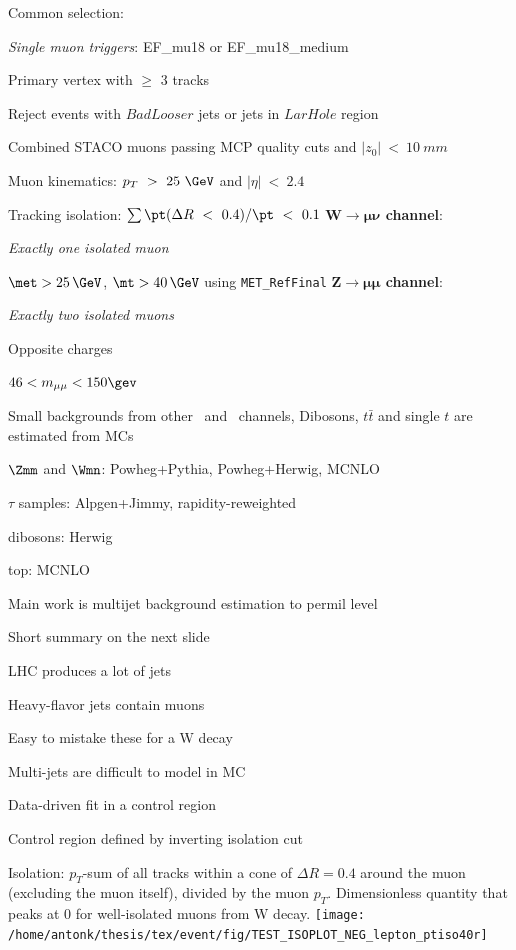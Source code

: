 {
Common selection:
\iteb
\item \textit{Single muon triggers}: EF\_mu18 or EF\_mu18\_medium
\item Primary vertex with $\ge$ 3 tracks
\item Reject events with $BadLooser$ jets or jets in $LarHole$ region
\item Combined STACO muons passing MCP quality cuts and $|z_0|~<~10~mm$
\item Muon kinematics: $p_T~>~25~\GeV$ and $|\eta|~<~2.4$
\item Tracking isolation: $\sum \pt(\Delta R~<~0.4) / \pt~<~0.1$
\itee
\textbf{\large $\mathbf{W \to \mu\nu}$ channel}:
\iteb
\item \textit{Exactly one isolated muon}
\item $\met > 25\,\GeV$, $\mt > 40\,\GeV$ using \texttt{MET\_RefFinal}
\itee
\textbf{\large $\mathbf{Z \to \mu\mu}$ channel}:
\iteb
\item \textit{Exactly two isolated muons}
\item Opposite charges
\item $46 < m_{\mu\mu} < 150\gev$
\itee
}

{
\iteb
\item Small backgrounds from other \Zll\ and \Wln\ channels, Dibosons,
  $t\bar{t}$ and single $t$ are estimated from MCs
\iteb
\item $\Zmm$ and $\Wmn$: Powheg+Pythia, Powheg+Herwig, MCNLO
\item $\tau$ samples: Alpgen+Jimmy, rapidity-reweighted
\item dibosons: Herwig
\item top: MCNLO
\itee
\item Main work is multijet background estimation to permil level
\iteb
\item Short summary on the next slide
\itee
\itee
}

{
\iteb
\item LHC produces a lot of jets
\item Heavy-flavor jets contain muons
\item Easy to mistake these for a W decay
\item Multi-jets are difficult to model in MC
\iteb
\item Data-driven fit in a control region
\item Control region defined by inverting isolation cut
\itee
\itee

\colb[T]
\centering
\small{
\vspace{.5cm}
Isolation: $p_T$-sum of all tracks within a cone of $\Delta R = 0.4$ around the muon (excluding the muon itself), divided by the muon $p_T$. Dimensionless quantity that peaks at 0 for well-isolated muons from W decay.
}
\centering
\texttt{[image: /home/antonk/thesis/tex/event/fig/TEST\_ISOPLOT\_NEG\_lepton\_ptiso40r]}
\cole

}

